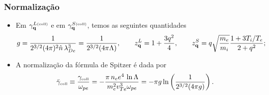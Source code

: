 \documentclass[10pt,aspectratio=1610,lualatex]{beamer}
\begin{document}
\begin{frame}
  \frametitle{Normalização}
  \begin{itemize}
    \item Em $\gamma_{\bf q}^{L\mbox{\tiny(coll)}}$ e em
    $\gamma_{\bf q}^{S\mbox{\tiny(coll)}}$, temos as seguintes
    quantidades
    \begin{eqnarray*}
      g=\frac{1}{2^{3/2}(4\pi)^2\hat n\,\lambda_{De}^3}
      =\frac{1}{2^{3/2}(4\pi\Lambda)},\qquad
      z_{\bf q}^L=1+\frac{3q^2}{4},\qquad
      z_{\bf q}^S=q \sqrt{\frac{m_e}{m_i}}\frac{1+3T_i/T_e}{2+q^2};
    \end{eqnarray*}
    \vspace{0.3cm}
    \item A normalização da fórmula de Spitzer é dada por
    \begin{displaymath}
      \bar \gamma_{\mbox{\tiny coll}}\equiv
      \frac{\gamma_{\mbox{\tiny coll}}}{\omega_{pe}}
      =-\frac{\pi\, n_ee^4\,\ln \Lambda}{m_e^2 v_{Te}^3\omega_{pe}}
      =- \pi g \ln \left( \frac{1}{2^{3/2}(4\pi g)} \right).
    \end{displaymath}
  \end{itemize}
\end{frame}
\end{document}
